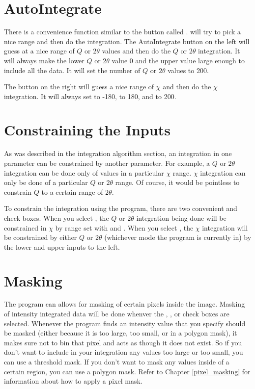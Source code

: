 \section{AutoIntegrate}

There is a convenience function similar to the
 button called . 
 will try to pick a nice range 
and then do the integration. The AutoIntegrate button 
on the left will guess at a nice range of $Q$ 
or $2\theta$ values and then do the $Q$ or
$2\theta$ integration.
It will always make the lower $Q$ or $2\theta$ 
value 0 and the upper value large enough
to include all the data.
It will set the number of $Q$ or $2\theta$ values to
200.

The  button on the right 
will guess a nice range of $\chi$ and then
do the $\chi$ integration. It will always 
set  to -180,  to
180, and  to 200.

\section{Constraining the Inputs}

As was described in the integration algorithm 
section, an integration in one parameter can 
be constrained by another parameter. For example,
a $Q$ or $2\theta$ integration can be done only 
of values in a particular $\chi$ range. 
$\chi$ integration can only be done of a
particular $Q$ or $2\theta$ range. Of course,
it would be pointless to constrain $Q$ to a
certain range of $2\theta$.

To constrain the integration using the program,
there are two convenient 
 and 
 check boxes.
When you select
, the
$Q$ or $2\theta$ integration being done
will be constrained in $\chi$ by range
set with  and .
When you select
, the
$\chi$ integration will be constrained by
either $Q$ or $2\theta$ (whichever mode the
program is currently in) by the lower and
upper inputs to the left.

\section{Masking}

The program can allows for masking of certain
pixels inside the image. 
Masking of intensity integrated data will be done
whenver the
, ,
or  check boxes are selected.
Whenever the program finds an intensity value
that you specify should be masked (either because it 
is too large, too small, or in a polygon mask), it makes
sure not to bin that pixel and acts as though
it does not exist. So if you don't want to include
in your integration any values too large or too
small, you can use a threshold mask. If you
don't want to mask any values inside of a certain
region, you can use a polygon mask. 
Refer to Chapter \ref{pixel_masking} for information 
about how to apply a pixel mask.


